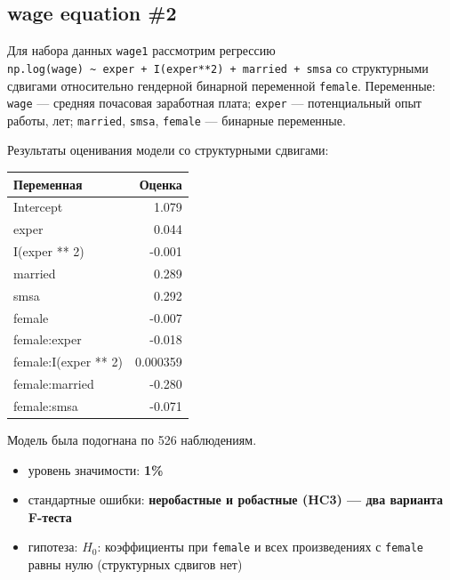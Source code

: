 \documentclass[
  russian,
]{article}
\newcounter{none} %
\providecommand{\tightlist}{%
  \setlength{\itemsep}{0pt}\setlength{\parskip}{0pt}}
\begin{document}
\subsection{wage equation \#2}\label{wage-equation-2}

Для набора данных \texttt{wage1} рассмотрим регрессию
\texttt{np.log(wage)\ \textasciitilde{}\ exper\ +\ I(exper**2)\ +\ married\ +\ smsa}
со структурными сдвигами относительно гендерной бинарной переменной
\texttt{female}. Переменные: \texttt{wage} --- средняя почасовая
заработная плата; \texttt{exper} --- потенциальный опыт работы, лет;
\texttt{married}, \texttt{smsa}, \texttt{female} --- бинарные
переменные.

Результаты оценивания модели со структурными сдвигами:

{\def\LTcaptype{none} %
\begin{longtable}[]{@{}lr@{}}
\toprule\noalign{}
Переменная & Оценка \\
\midrule\noalign{}
\endhead
\bottomrule\noalign{}
\endlastfoot
Intercept & 1.079 \\
exper & 0.044 \\
I(exper ** 2) & -0.001 \\
married & 0.289 \\
smsa & 0.292 \\
female & -0.007 \\
female:exper & -0.018 \\
female:I(exper ** 2) & 0.000359 \\
female:married & -0.280 \\
female:smsa & -0.071 \\
\end{longtable}
}

Модель была подогнана по 526 наблюдениям.

\begin{tcolorbox}[enhanced jigsaw, arc=.35mm, bottomrule=.15mm, bottomtitle=1mm, breakable, colback=white, colbacktitle=quarto-callout-important-color!10!white, colframe=quarto-callout-important-color-frame, coltitle=black, left=2mm, leftrule=.75mm, opacityback=0, opacitybacktitle=0.6, rightrule=.15mm, title=\textcolor{quarto-callout-important-color}{\faExclamation}\hspace{0.5em}{Условия теста}, titlerule=0mm, toprule=.15mm, toptitle=1mm]

\begin{itemize}
\tightlist
\item
  уровень значимости: \textbf{1\%}
\item
  стандартные ошибки: \textbf{неробастные и робастные (HC3) --- два
  варианта F-теста}
\item
  гипотеза: \(H_0\): коэффициенты при \texttt{female} и всех
  произведениях с \texttt{female} равны нулю (структурных сдвигов нет)
\end{itemize}

\end{tcolorbox}
\end{document}
